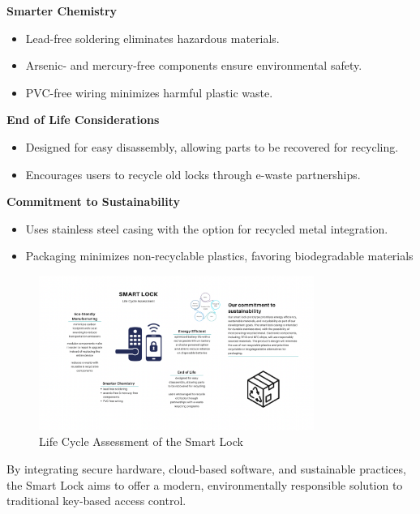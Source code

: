 \textbf{Smarter Chemistry}
\begin{itemize}
    \item Lead-free soldering eliminates hazardous materials.
    \item Arsenic- and mercury-free components ensure environmental safety.
    \item PVC-free wiring minimizes harmful plastic waste.
\end{itemize}

\textbf{End of Life Considerations}
\begin{itemize}
    \item Designed for easy disassembly, allowing parts to be recovered for recycling.
    \item Encourages users to recycle old locks through e-waste partnerships.
\end{itemize}

\textbf{Commitment to Sustainability}
\begin{itemize}
    \item Uses stainless steel casing with the option for recycled metal integration.
    \item Packaging minimizes non-recyclable plastics, favoring biodegradable materials
\end{itemize}

\begin{figure}[h]
    \centering
    \includegraphics[width=0.8\textwidth]{./img/LifeCycleAssessment.png}
    \caption{Life Cycle Assessment of the Smart Lock}
    \label{fig:lifecycle}
\end{figure}

\noindent By integrating secure hardware, cloud-based software, and sustainable practices, the Smart Lock aims to offer a modern, environmentally responsible solution to traditional key-based access control.